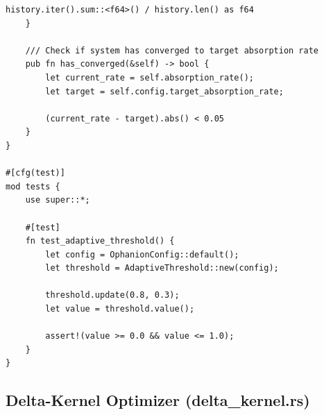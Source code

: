 \documentclass[11pt,a4paper]{article}
\begin{document}
\begin{lstlisting}[style=rust]
        history.iter().sum::<f64>() / history.len() as f64
    }
    
    /// Check if system has converged to target absorption rate
    pub fn has_converged(&self) -> bool {
        let current_rate = self.absorption_rate();
        let target = self.config.target_absorption_rate;
        
        (current_rate - target).abs() < 0.05
    }
}

#[cfg(test)]
mod tests {
    use super::*;
    
    #[test]
    fn test_adaptive_threshold() {
        let config = OphanionConfig::default();
        let threshold = AdaptiveThreshold::new(config);
        
        threshold.update(0.8, 0.3);
        let value = threshold.value();
        
        assert!(value >= 0.0 && value <= 1.0);
    }
}
\end{lstlisting}

\subsection{Delta-Kernel Optimizer (delta\_kernel.rs)}
\end{document}
